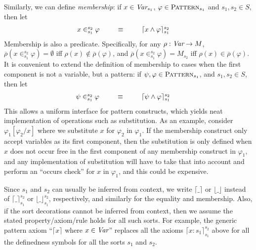 \documentclass[UTF8,11pt]{article}
\theoremstyle{plain}
\theoremstyle{definition}
\theoremstyle{remark}
\newcommand{\Pattern}{\textsc{Pattern}\xspace}
\newcommand{\ra}{\rightarrow}
\begin{document}
Similarly, we can define \emph{membership}:
if $x\in\textit{Var}_{s_1}$, $\varphi\in\Pattern_{s_1}$ and $s_1,s_2\in S$, then
let
$$
\begin{array}{@{}rcll}
x \in_{s_1}^{s_2} \varphi & \ \ \ \ \ \equiv \ \ \ \ \ &
\lceil x \wedge \varphi\rceil_{s_1}^{s_2}
& %
\end{array}
$$
Membership is also a predicate.
Specifically, for any $\rho:\Var\ra M$,
$\overline{\rho}(x \in_{s_1}^{s_2} \varphi) = \emptyset$
iff $\rho(x) \not\in \overline{\rho}(\varphi)$, and
$\overline{\rho}(x \in_{s_1}^{s_2} \varphi) = M_{s_2}$
iff $\rho(x) \in \overline{\rho}(\varphi)$.
It is convenient to extend the definition of membership to cases when the first 
component is not a variable, but a pattern:
if $\psi, \varphi \in \Pattern_{s_1}$, and $s_1,s_2\in S$, 
then let
$$
\begin{array}{@{}rcll}
\psi \in_{s_1}^{s_2} \varphi & \ \ \ \ \ \equiv \ \ \ \ \ &
\lceil \psi \wedge \varphi\rceil_{s_1}^{s_2}
& %
\end{array}
$$
This allows a uniform interface for pattern constructs, which yields neat 
implementation of operations such as substitution.
As an example, consider $\varphi_1[\varphi_2 / x]$ where we 
substitute $x$ for $\varphi_2$ in $\varphi_1$.
If the membership construct only accept variables as its first component, then 
the substitution is only defined when $x$ does not occur free in the first 
component of any membership construct in $\varphi_1$, and any implementation of 
substitution will have to take that into account and perform an 
``occurs check'' for $x$ in $\varphi_1$, and this could be expensive.

Since $s_1$ and $s_2$ can usually be inferred from context,
we write $\lceil\_\rceil$ or $\lfloor\_\rfloor$ instead of
$\lceil\_\rceil_{s_1}^{s_2}$ or $\lfloor\_\rfloor_{s_1}^{s_2}$, respectively,
and similarly for the equality and membership.
Also, if the sort decorations cannot be inferred from context, then we assume
the stated property/axiom/rule holds for all such sorts.
%
For example, the generic pattern axiom ``$\lceil x \rceil$ where $x\in\textit{Var}$''
replaces all the axioms $\lceil x\!:\!s_1 \rceil_{s_1}^{s_2}$ above for all
the definedness symbols for all the sorts $s_1$ and $s_2$.
\end{document}
